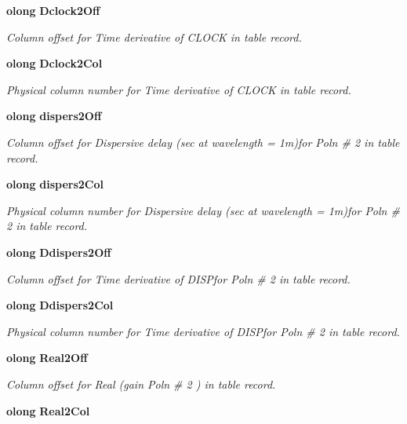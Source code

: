 \begin{CompactItemize}
{\bf olong} {\bf Dclock2Off}
\begin{CompactList}\small\item\em Column offset for Time derivative of CLOCK in table record. \item\end{CompactList}\item 
{\bf olong} {\bf Dclock2Col}
\begin{CompactList}\small\item\em Physical column number for Time derivative of CLOCK in table record. \item\end{CompactList}\item 
{\bf olong} {\bf dispers2Off}
\begin{CompactList}\small\item\em Column offset for Dispersive delay (sec at wavelength = 1m)for Poln \# 2 in table record. \item\end{CompactList}\item 
{\bf olong} {\bf dispers2Col}
\begin{CompactList}\small\item\em Physical column number for Dispersive delay (sec at wavelength = 1m)for Poln \# 2 in table record. \item\end{CompactList}\item 
{\bf olong} {\bf Ddispers2Off}
\begin{CompactList}\small\item\em Column offset for Time derivative of DISPfor Poln \# 2 in table record. \item\end{CompactList}\item 
{\bf olong} {\bf Ddispers2Col}
\begin{CompactList}\small\item\em Physical column number for Time derivative of DISPfor Poln \# 2 in table record. \item\end{CompactList}\item 
{\bf olong} {\bf Real2Off}
\begin{CompactList}\small\item\em Column offset for Real (gain Poln \# 2 ) in table record. \item\end{CompactList}\item 
{\bf olong} {\bf Real2Col}

\end{CompactItemize}
